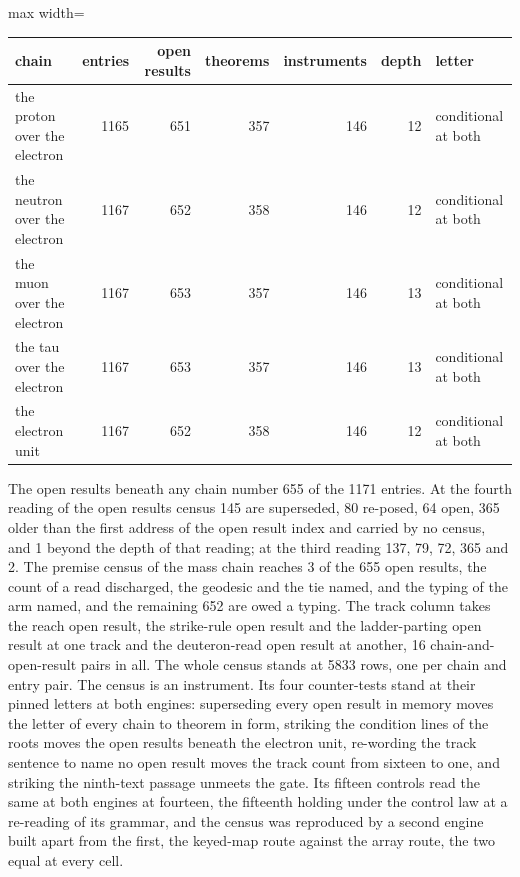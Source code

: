 \begin{chproof}[instrument]
\begin{center}\begin{adjustbox}{max width=\linewidth}\begin{tabular}{lrrrrrl}\hline chain & entries & open results & theorems & instruments & depth & letter \\ \hline the proton over the electron & 1165 & 651 & 357 & 146 & 12 & conditional at both \\ the neutron over the electron & 1167 & 652 & 358 & 146 & 12 & conditional at both \\ the muon over the electron & 1167 & 653 & 357 & 146 & 13 & conditional at both \\ the tau over the electron & 1167 & 653 & 357 & 146 & 13 & conditional at both \\ the electron unit & 1167 & 652 & 358 & 146 & 12 & conditional at both \\ \hline \end{tabular}\end{adjustbox}\end{center}
The open results beneath any chain number 655 of the 1171 entries. At the fourth reading of the open results census 145 are superseded, 80 re-posed, 64 open, 365 older than the first address of the open result index and carried by no census, and 1 beyond the depth of that reading; at the third reading 137, 79, 72, 365 and 2. The premise census of the mass chain reaches 3 of the 655 open results, the count of a read discharged, the geodesic and the tie named, and the typing of the arm named, and the remaining 652 are owed a typing. The track column takes the reach open result, the strike-rule open result and the ladder-parting open result at one track and the deuteron-read open result at another, 16 chain-and-open-result pairs in all. The whole census stands at 5833 rows, one per chain and entry pair.
The census is an instrument. Its four counter-tests stand at their pinned letters at both engines: superseding every open result in memory moves the letter of every chain to theorem in form, striking the condition lines of the roots moves the open results beneath the electron unit, re-wording the track sentence to name no open result moves the track count from sixteen to one, and striking the ninth-text passage unmeets the gate. Its fifteen controls read the same at both engines at fourteen, the fifteenth holding under the control law at a re-reading of its grammar, and the census was reproduced by a second engine built apart from the first, the keyed-map route against the array route, the two equal at every cell.
\end{chproof}
